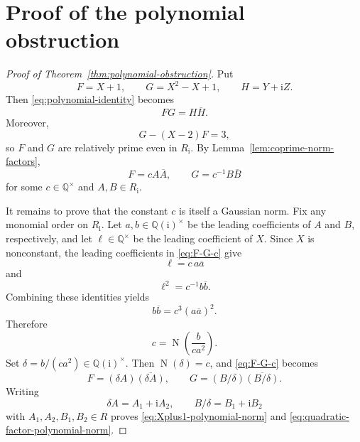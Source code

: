 \documentclass[11pt,a4paper]{article}
\numberwithin{equation}{section}
\theoremstyle{definition}
\newcommand{\Q}{\mathbb Q}
\newcommand{\ii}{\mathrm i}
\newcommand{\N}{\operatorname N}
\newcommand{\ol}[1]{\overline{#1}}
\begin{document}
\section{Proof of the polynomial obstruction}
\label{sec:polynomial-obstruction-proof}

\begin{proof}[Proof of Theorem~\ref{thm:polynomial-obstruction}]
Put
\[
 F=X+1,
 \qquad
 G=X^2-X+1,
 \qquad
 H=Y+\ii Z.
\]
Then \eqref{eq:polynomial-identity} becomes
\begin{equation}
 FG=H\ol H.
 \label{eq:norm-factorization-polynomial}
\end{equation}
Moreover,
\begin{equation}
 G-(X-2)F=3,
 \label{eq:bezout-FG}
\end{equation}
so $F$ and $G$ are relatively prime even in $R_{\ii}$.  By
Lemma~\ref{lem:coprime-norm-factors},
\begin{equation}
 F=cA\ol A,
 \qquad
 G=c^{-1}B\ol B
 \label{eq:F-G-c}
\end{equation}
for some $c\in\Q^\times$ and $A,B\in R_{\ii}$.

It remains to prove that the constant $c$ is itself a Gaussian norm.  Fix any
monomial order on $R_{\ii}$.  Let $a,b\in\Q(\ii)^\times$ be the leading
coefficients of $A$ and $B$, respectively, and let $\ell\in\Q^\times$ be the
leading coefficient of $X$.  Since $X$ is nonconstant, the leading
coefficients in \eqref{eq:F-G-c} give
\begin{equation}
 \ell=c\,a\ol a
 \label{eq:leading-one}
\end{equation}
and
\begin{equation}
 \ell^2=c^{-1}b\ol b.
 \label{eq:leading-two}
\end{equation}
Combining these identities yields
\[
 b\ol b=c^3(a\ol a)^2.
\]
Therefore
\begin{equation}
 c=
 \N\!\left(\frac{b}{c a^2}\right).
 \label{eq:c-is-norm}
\end{equation}
Set $\delta=b/(ca^2)\in\Q(\ii)^\times$.  Then $\N(\delta)=c$, and
\eqref{eq:F-G-c} becomes
\[
 F=(\delta A)\ol{(\delta A)},
 \qquad
 G=(B/\delta)\ol{(B/\delta)}.
\]
Writing
\[
 \delta A=A_1+\ii A_2,
 \qquad
 B/\delta=B_1+\ii B_2
\]
with $A_1,A_2,B_1,B_2\in R$ proves
\eqref{eq:Xplus1-polynomial-norm} and
\eqref{eq:quadratic-factor-polynomial-norm}.
\end{proof}
\end{document}
